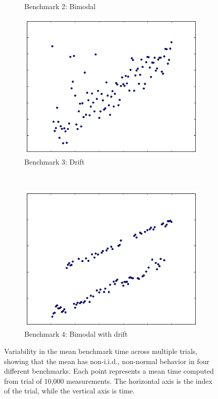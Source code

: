 \documentclass[conference]{IEEEtran}
\begin{document}
\begin{figure}
\begin{subfigure}{0.22\textwidth}
    \caption{Benchmark 2: Bimodal}
\end{subfigure}
\begin{subfigure}{0.22\textwidth}
    \centering
    \includegraphics[width=\textwidth]{figures/fig1/drift_manyallocs_slow}
    \caption{Benchmark 3: Drift}
\end{subfigure}
~
\begin{subfigure}{0.22\textwidth}
    \centering
    \includegraphics[width=\textwidth]{figures/fig1/bimodal_drift_sumindex}
    \caption{Benchmark 4: Bimodal with drift}
\end{subfigure}
\caption{Variability in the mean benchmark time across multiple trials, showing
that the mean has non-i.i.d., non-normal behavior in four different benchmarks.
Each point represents a mean time computed from trial of 10,000 measurements.
The horizontal axis is the index of the trial, while the vertical axis is time.}
\label{fig:meandistributions}
\vspace{-0.45cm} %
\end{figure}
\end{document}
